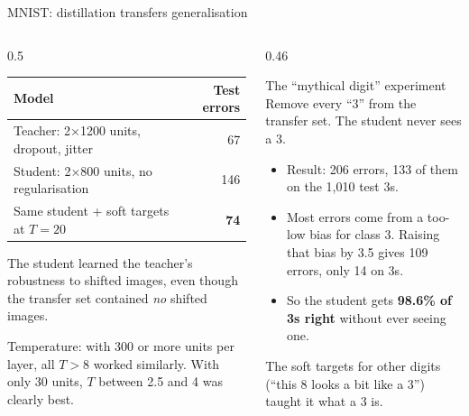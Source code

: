 \documentclass[aspectratio=169,11pt]{beamer}
\begin{document}
\begin{frame}{MNIST: distillation transfers generalisation}
  \begin{columns}[T]
    \begin{column}{0.5\textwidth}
      \footnotesize
      \begin{tabular}{@{}lr@{}}
        \toprule
        Model & Test errors\\
        \midrule
        Teacher: 2$\times$1200 units, dropout, jitter & 67\\
        Student: 2$\times$800 units, no regularisation & 146\\
        Same student + soft targets at $T=20$ & \textbf{74}\\
        \bottomrule
      \end{tabular}
      \vspace{2mm}

      The student learned the teacher's robustness to shifted images, even though the transfer set contained \emph{no} shifted images.
      \vspace{1mm}

      Temperature: with 300 or more units per layer, all $T>8$ worked similarly. With only 30 units, $T$ between 2.5 and 4 was clearly best.
    \end{column}
    \begin{column}{0.46\textwidth}
      \begin{exampleblock}{The ``mythical digit'' experiment}
        \small
        Remove every ``3'' from the transfer set. The student never sees a 3.
        \begin{itemize}
          \item Result: 206 errors, 133 of them on the 1,010 test 3s.
          \item Most errors come from a too-low bias for class 3. Raising that bias by 3.5 gives 109 errors, only 14 on 3s.
          \item So the student gets \textbf{98.6\% of 3s right} without ever seeing one.
        \end{itemize}
        The soft targets for other digits (``this 8 looks a bit like a 3'') taught it what a 3 is.
      \end{exampleblock}
    \end{column}
  \end{columns}
\end{frame}
\end{document}
